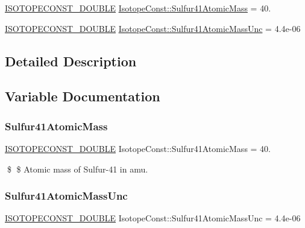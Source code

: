\begin{DoxyCompactItemize}
\item 
\mbox{\hyperlink{group___isotope_const-_macros_ga8f45a7272ce02c0b4c65c44636ed719a}{I\+S\+O\+T\+O\+P\+E\+C\+O\+N\+S\+T\+\_\+\+D\+O\+U\+B\+LE}} \mbox{\hyperlink{group___isotope_const-_sulfur-_s41_gad33c6581d7580563bc9f71a59bff2dcf}{Isotope\+Const\+::\+Sulfur41\+Atomic\+Mass}} = 40.
\item 
\mbox{\hyperlink{group___isotope_const-_macros_ga8f45a7272ce02c0b4c65c44636ed719a}{I\+S\+O\+T\+O\+P\+E\+C\+O\+N\+S\+T\+\_\+\+D\+O\+U\+B\+LE}} \mbox{\hyperlink{group___isotope_const-_sulfur-_s41_gae6aef72653d6df0d32bee4129df49fc8}{Isotope\+Const\+::\+Sulfur41\+Atomic\+Mass\+Unc}} = 4.\+4e-\/06
\end{DoxyCompactItemize}


\subsection{Detailed Description}


\subsection{Variable Documentation}
\mbox{\label{group___isotope_const-_sulfur-_s41_gad33c6581d7580563bc9f71a59bff2dcf}} 
\subsubsection{\texorpdfstring{Sulfur41\+Atomic\+Mass}{Sulfur41AtomicMass}}
{\footnotesize\ttfamily \mbox{\hyperlink{group___isotope_const-_macros_ga8f45a7272ce02c0b4c65c44636ed719a}{I\+S\+O\+T\+O\+P\+E\+C\+O\+N\+S\+T\+\_\+\+D\+O\+U\+B\+LE}} Isotope\+Const\+::\+Sulfur41\+Atomic\+Mass = 40.}

\$ \$ Atomic mass of Sulfur-\/41 in amu. \mbox{\label{group___isotope_const-_sulfur-_s41_gae6aef72653d6df0d32bee4129df49fc8}} 
\subsubsection{\texorpdfstring{Sulfur41\+Atomic\+Mass\+Unc}{Sulfur41AtomicMassUnc}}
{\footnotesize\ttfamily \mbox{\hyperlink{group___isotope_const-_macros_ga8f45a7272ce02c0b4c65c44636ed719a}{I\+S\+O\+T\+O\+P\+E\+C\+O\+N\+S\+T\+\_\+\+D\+O\+U\+B\+LE}} Isotope\+Const\+::\+Sulfur41\+Atomic\+Mass\+Unc = 4.\+4e-\/06}


